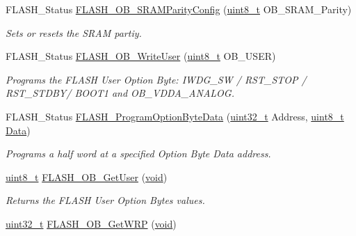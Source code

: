 \begin{DoxyCompactItemize}
F\-L\-A\-S\-H\-\_\-\-Status \hyperlink{group___f_l_a_s_h___group3_ga186b89887484d12f5e42c107ac5aa7be}{F\-L\-A\-S\-H\-\_\-\-O\-B\-\_\-\-S\-R\-A\-M\-Parity\-Config} (\hyperlink{stdint_8h_aba7bc1797add20fe3efdf37ced1182c5}{uint8\-\_\-t} O\-B\-\_\-\-S\-R\-A\-M\-\_\-\-Parity)
\begin{DoxyCompactList}\small\item\em Sets or resets the S\-R\-A\-M partiy. \end{DoxyCompactList}\item 
F\-L\-A\-S\-H\-\_\-\-Status \hyperlink{group___f_l_a_s_h___group3_ga05c8e73cfadb45ed23224ace99ceb6e3}{F\-L\-A\-S\-H\-\_\-\-O\-B\-\_\-\-Write\-User} (\hyperlink{stdint_8h_aba7bc1797add20fe3efdf37ced1182c5}{uint8\-\_\-t} O\-B\-\_\-\-U\-S\-E\-R)
\begin{DoxyCompactList}\small\item\em Programs the F\-L\-A\-S\-H User Option Byte\-: I\-W\-D\-G\-\_\-\-S\-W / R\-S\-T\-\_\-\-S\-T\-O\-P / R\-S\-T\-\_\-\-S\-T\-D\-B\-Y/ B\-O\-O\-T1 and O\-B\-\_\-\-V\-D\-D\-A\-\_\-\-A\-N\-A\-L\-O\-G. \end{DoxyCompactList}\item 
F\-L\-A\-S\-H\-\_\-\-Status \hyperlink{group___f_l_a_s_h___group3_ga1382ff9d4ded8a5c076fde4fff529d21}{F\-L\-A\-S\-H\-\_\-\-Program\-Option\-Byte\-Data} (\hyperlink{stdint_8h_a435d1572bf3f880d55459d9805097f62}{uint32\-\_\-t} Address, \hyperlink{stdint_8h_aba7bc1797add20fe3efdf37ced1182c5}{uint8\-\_\-t} \hyperlink{group___copter_control_b_l_ga6f3335509cc4943e20df66f72483910c}{Data})
\begin{DoxyCompactList}\small\item\em Programs a half word at a specified Option Byte Data address. \end{DoxyCompactList}\item 
\hyperlink{stdint_8h_aba7bc1797add20fe3efdf37ced1182c5}{uint8\-\_\-t} \hyperlink{group___f_l_a_s_h___group3_ga737dd808489113af7f8df7f7e9f7baae}{F\-L\-A\-S\-H\-\_\-\-O\-B\-\_\-\-Get\-User} (\hyperlink{group___n_a_m_e_ga18028b8badbf1ea7e704ccac3c488e82}{void})
\begin{DoxyCompactList}\small\item\em Returns the F\-L\-A\-S\-H User Option Bytes values. \end{DoxyCompactList}\item 
\hyperlink{stdint_8h_a435d1572bf3f880d55459d9805097f62}{uint32\-\_\-t} \hyperlink{group___f_l_a_s_h___group3_gad10ffc456355b88923f098e9ee9fab36}{F\-L\-A\-S\-H\-\_\-\-O\-B\-\_\-\-Get\-W\-R\-P} (\hyperlink{group___n_a_m_e_ga18028b8badbf1ea7e704ccac3c488e82}{void})

\end{DoxyCompactItemize}
